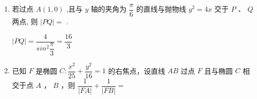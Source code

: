 \begin{enumerate}
\begin{jieda}
        综上，$k \in [-\sqrt{3}, -1] \cup [1, \sqrt{3}]$，因此$\alpha \in \left[\dfrac{\pi}{4}, \dfrac{\pi}{3}\right] \cup \left[\dfrac{2\pi}{3}, \dfrac{3\pi}{4}\right]$
    \end{jieda}
    \item 若过点 $A\left( {1,0}\right)$ ,且与 $y$ 轴的夹角为 $\dfrac{\pi }{6}$ 的直线与抛物线 ${y}^{2} = {4x}$ 交于 $P\text{ 、 }Q$ 两点, 则 $\left| {PQ}\right|  =$ .
    \begin{jieda}
        $|PQ| = \dfrac{4}{sin^2\dfrac{\pi}{3}} = \dfrac{16}{3}$
    \end{jieda}
    \item 已知 $F$ 是椭圆 $C : \dfrac{x^2}{25} + \dfrac{y^2}{16} = 1$ 的右焦点，设直线 $AB$ 过点 $F$ 且与椭圆 $C$ 相交于点 $A$ ， $B$ ，则 $\dfrac{1}{|FA|} + \dfrac{1}{|FB|} =$ 
\end{enumerate}
